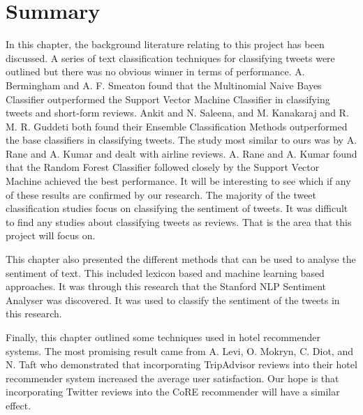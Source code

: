 \section{Summary}


In this chapter, the background literature relating to this project has been discussed. A series of text classification techniques  for classifying tweets were outlined but there was no obvious winner in terms of performance. A. Bermingham and A. F. Smeaton \cite{Berm2010} found that the Multinomial Naive Bayes Classifier outperformed the Support Vector Machine Classifier in classifying tweets and short-form reviews. Ankit and N. Saleena, and M. Kanakaraj and R. M. R. Guddeti \cite{Ankit2018,Kanakaraj2015} both found their Ensemble Classification Methods outperformed the base classifiers in classifying tweets. The study most similar to ours was by A. Rane and A. Kumar \cite{Rane2018} and dealt with airline reviews. A. Rane and A. Kumar \cite{Rane2018} found that the Random Forest Classifier followed closely by the Support Vector Machine achieved the best performance. It will be interesting to see which if any of these results are confirmed by our research. The majority of the tweet classification studies focus on classifying the sentiment of tweets. It was difficult to find any studies about classifying tweets as reviews. That is the area that this project will focus on. 

This chapter also presented the different methods that can be used to analyse the sentiment of text. This included lexicon based and machine learning based approaches. It was through this research that the Stanford NLP Sentiment Analyser \cite{stanfordSentiment2013} was discovered. It was used to classify the sentiment of the tweets in this research.

Finally, this chapter outlined some techniques used in hotel recommender systems. The most promising result came from A. Levi, O. Mokryn, C. Diot, and N. Taft \cite{levi2012} who demonstrated that incorporating TripAdvisor reviews into their hotel recommender system increased the average user satisfaction. Our hope is that incorporating Twitter reviews into the CoRE recommender will have a similar effect.